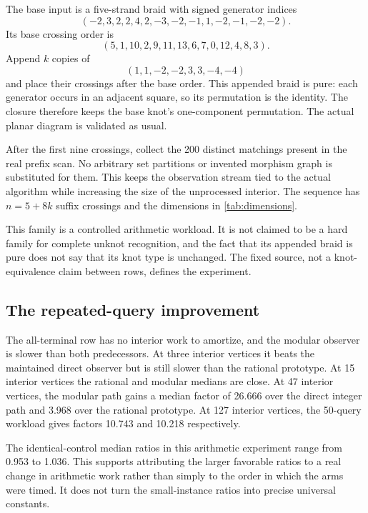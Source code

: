 The base input is a five-strand braid with signed generator indices
\[
 (-2,3,2,2,4,2,-3,-2,-1,1,-2,-1,-2,-2).
\]
Its base crossing order is
\[
 (5,1,10,2,9,11,13,6,7,0,12,4,8,3).
\]
Append $k$ copies of
\[
                         (1,1,-2,-2,3,3,-4,-4)
\]
and place their crossings after the base order. This appended braid is pure:
each generator occurs in an adjacent square, so its permutation is the identity.
The closure therefore keeps the base knot's one-component permutation. The
actual planar diagram is validated as usual.

After the first nine crossings, collect the 200 distinct matchings present in
the real prefix scan. No arbitrary set partitions or invented morphism graph
is substituted for them. This keeps the observation stream tied to the actual
algorithm while increasing the size of the unprocessed interior. The sequence
has $n=5+8k$ suffix crossings and the dimensions in \cref{tab:dimensions}.



This family is a controlled arithmetic workload. It is not claimed to be a
hard family for complete unknot recognition, and the fact that its appended
braid is pure does not say that its knot type is unchanged. The fixed source,
not a knot-equivalence claim between rows, defines the experiment.

\subsection{The repeated-query improvement}



The all-terminal row has no interior work to amortize, and the modular observer
is slower than both predecessors. At three interior vertices it beats the
maintained direct observer but is still slower than the rational prototype.
At 15 interior vertices the rational and modular medians are close. At 47
interior vertices, the modular path gains a median factor of 26.666 over the
direct integer path and 3.968 over the rational prototype. At 127 interior
vertices, the 50-query workload gives factors 10.743 and 10.218 respectively.

The identical-control median ratios in this arithmetic experiment range from
0.953 to 1.036. This supports attributing the larger favorable ratios to a real
change in arithmetic work rather than simply to the order in which the arms
were timed. It does not turn the small-instance ratios into precise universal
constants.

